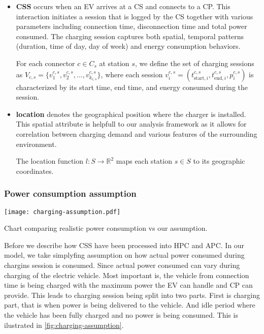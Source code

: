 \begin{itemize}
    \item \textbf{\acrlong{CSS}} occurs when an \acrshort{EV} arrives at a \acrshort{CS} and connects to a \acrshort{CP}. This interaction initiates a session that is logged by the \acrshort{CS} together with various parameters including connection time, disconnection time and total power consumed. The charging session captures both spatial, temporal patterns (duration, time of day, day of week) and energy consumption behaviors.

          \vspace{3.5mm}

          For each connector $c \in C_s$ at station $s$, we define the set of charging sessions as $V_{c,s} = \{v_1^{c,s}, v_2^{c,s}, ..., v_{k_{c,s}}^{c,s}\}$, where each session $v_i^{c,s} = (t_{\text{start},i}^{c,s}, t_{\text{end},i}^{c,s}, p_i^{c,s})$ is characterized by its start time, end time, and energy consumed during the session.

    \item \textbf{location} denotes the geographical position where the charger is installed. This spatial attribute is helpfull to our analysis framework as it allows for correlation between charging demand and various features of the surrounding environment.

          \vspace{3.5mm}

          The location function $l: S \rightarrow \mathbb{R}^2$ maps each station $s \in S$ to its geographic coordinates.

\end{itemize}

\subsubsection{Power consumption assumption}

\begin{marginfigure}
    \texttt{[image: charging-assumption.pdf]}
    \caption[Charging assumption]{Chart comparing realistic power consumption vs our assumption.}
    \label{fig:charging-assumption}
\end{marginfigure}

Before we describe how \acrlong{CSS} have been processed into \acrlong{HPC} and \acrlong{APC}. In our model, we take simplyfing assumption on how actual power consumed during chargins session is consumed. Since actual power consumed can vary during charging of the electric vehicle. Most important is, the vehicle from connection time is being charged with the maximum power the \acrlong{EV} can handle and \acrlong{CP} can provide. This leads to charging session being split into two parts. First is charging part, that is when power is being delivered to the vehicle. And idle period where the vehicle has been fully charged and no power is being consumed. This is ilustrated in \ref{fig:charging-assumption}.

